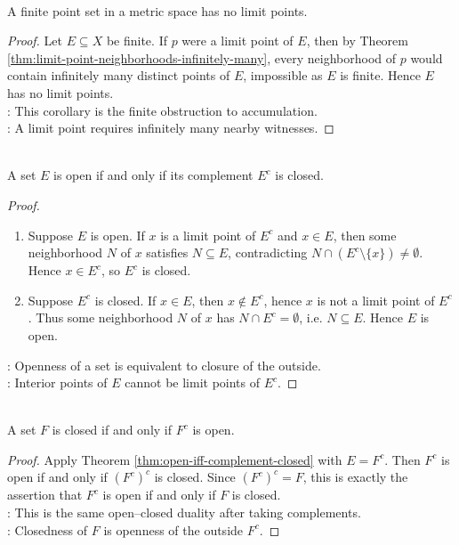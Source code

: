 \begin{corollary} \label{cor:finite-point-set-no-limit-points} \\
A finite point set in a metric space has no limit points.
\begin{proof}
Let $E\subseteq X$ be finite. If $p$ were a limit point of $E$, then by Theorem \ref{thm:limit-point-neighborhoods-infinitely-many}, every neighborhood of $p$ would contain infinitely many distinct points of $E$, impossible as $E$ is finite. Hence $E$ has no limit points.\\
: This corollary is the finite obstruction to accumulation.\\
: A limit point requires infinitely many nearby witnesses.
\end{proof}
\end{corollary}

\begin{theorem} \label{thm:open-iff-complement-closed} \\
A set $E$ is open if and only if its complement $E^c$ is closed.
\begin{proof}
\begin{enumerate}[label=\roman*.]
\setlength{\itemsep}{0pt}
\item[$(\Rightarrow)$] Suppose $E$ is open. If $x$ is a limit point of $E^c$ and $x\in E$, then some neighborhood $N$ of $x$ satisfies $N\subseteq E$, contradicting $N\cap(E^c\setminus\{x\})\neq\emptyset$. Hence $x\in E^c$, so $E^c$ is closed.
\item[$(\Leftarrow)$] Suppose $E^c$ is closed. If $x\in E$, then $x\notin E^c$, hence $x$ is not a limit point of $E^c$. Thus some neighborhood $N$ of $x$ has $N\cap E^c=\emptyset$, i.e. $N\subseteq E$. Hence $E$ is open.
\end{enumerate}
: Openness of a set is equivalent to closure of the outside.\\
: Interior points of $E$ cannot be limit points of $E^c$.
\end{proof}
\end{theorem}

\begin{corollary} \label{cor:closed-iff-complement-open} \\
A set $F$ is closed if and only if $F^c$ is open.
\begin{proof}
Apply Theorem \ref{thm:open-iff-complement-closed} with $E=F^c$. Then $F^c$ is open if and only if $(F^c)^c$ is closed. Since $(F^c)^c=F$, this is exactly the assertion that $F^c$ is open if and only if $F$ is closed.\\
: This is the same open--closed duality after taking complements.\\
: Closedness of $F$ is openness of the outside $F^c$.
\end{proof}
\end{corollary}

